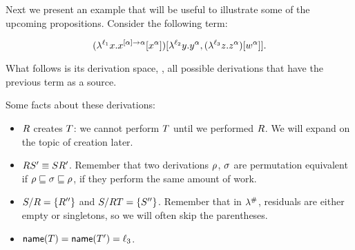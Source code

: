 \bigskip
\begin{example}
Next we present an example that will be useful to illustrate
some of the upcoming propositions. Consider the following term:

\[
  (\lambda^{\ell_1} x. x^{[\alpha] \to \alpha} [x^\alpha])
    [\lambda^{\ell_2} y. y^\alpha,
    (\lambda^{\ell_3} z. z^\alpha) [w^\alpha]].
\]

What follows is its derivation space, \ie,
all possible derivations that have the previous term as a source.

\end{example}

Some facts about these derivations:

\begin{itemize}
  \item $R$ creates $T$: we cannot perform $T$ until we performed $R$. We will expand on the topic of creation later.
  \item $R S' \equiv S R'$. Remember that two derivations $\rho$,
    $\sigma$ are permutation equivalent if $\rho \sqsubseteq \sigma \sqsubseteq \rho$,
    \ie if they perform the same amount of work.
  \item $S / R = \{R''\}$ and
    $S / R T = \{S''\}$. Remember that in $\lambda^{\mathtt{\#}}$,
    residuals are either empty or singletons, so we will often skip the parentheses.
  \item $\mathsf{name}(T) = \mathsf{name}(T') = \ell_3$.
\end{itemize}
